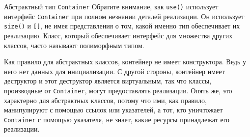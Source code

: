 \documentclass[
    8pt,
    hyperref={pdfencoding=unicode}
    ]{beamer}
\theoremstyle{definition}
\begin{document}
\begin{frame}{Абстрактный тип \texttt{Container}}
    Обратите внимание, как \texttt{use()} использует интерфейс \texttt{Container} при полном незнании деталей 
    реализации. Он использует \texttt{size()} и \texttt{[]}, не имея представления о том, какой именно тип 
    обеспечивает их реализацию. Класс, который обеспечивает интерфейс для множества других классов, часто называют полиморфным типом.
    
    \vspace{4mm}
    
    Как правило для абстрактных классов, контейнер не имеет конструктора.
    Ведь у него нет данных для инициализации. С другой стороны, контейнер имеет деструктор и этот деструктор
    является виртуальным, так что классы, производные от \texttt{Container},
    могут предоставлять реализации. Опять же, это характерно для абстрактных классов, потому что ими, как правило, манипулируют с 
    помощью ссылок или указателей, а тот, кто уничтожает \texttt{Container} с помощью указателя, не знает, 
    какие ресурсы принадлежат его реализации.    
\end{frame}
\end{document}
